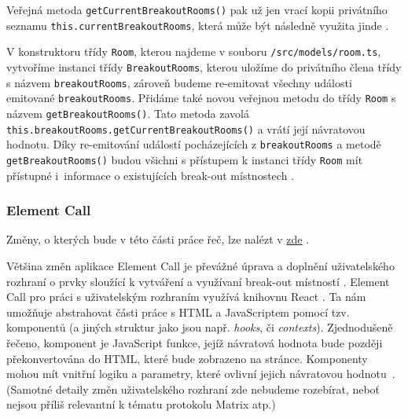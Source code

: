 Veřejná metoda \texttt{getCurrentBreakoutRooms()} pak už jen
vrací kopii privátního seznamu
\texttt{this.currentBreakoutRooms}, která může být následně
využita jinde \parencite{GitHub-MatrixJSSDK-BreakoutRooms}.

V konstruktoru třídy \texttt{Room}, kterou najdeme v souboru
\texttt{/src/models/room.ts}, vytvoříme instanci třídy
\texttt{BreakoutRooms}, kterou uložíme do privátního člena třídy
s názvem \texttt{breakoutRooms}, zároveň budeme re-emitovat
všechny události emitované \texttt{breakoutRooms}. Přidáme také
novou veřejnou metodu do třídy \texttt{Room} s názvem
\texttt{getBreakoutRooms()}. Tato metoda zavolá
\texttt{this.breakoutRooms.getCurrentBreakoutRooms()} a vrátí
její návratovou hodnotu. Díky re-emitování událostí pocházejících z
\texttt{breakoutRooms} a metodě
\texttt{getBreakoutRooms()} budou všichni s přístupem k instanci
třídy \texttt{Room} mít přístupné i~informace o existujících
break-out místnostech \parencite{GitHub-MatrixJSSDK-BreakoutRooms}.

\subsubsection{Element Call}

Změny, o kterých bude v této části práce řeč, lze nalézt v
\href{https://github.com/vector-im/element-call/pull/1615/}{zde}
\parencite{GitHub-ElementCall-BreakoutRooms}.

Většina změn aplikace Element Call je převážné úprava a doplnění uživatelského
rozhraní o prvky sloužící k vytváření a využívaní break-out místností
\parencite{GitHub-ElementCall-BreakoutRooms}. Element Call pro práci s uživatelským
rozhraním využívá knihovnu React \parencite{GitHub-ElementCall}. Ta nám umožňuje
abstrahovat části práce s HTML a JavaScriptem pomocí tzv. komponentů (a jiných
struktur jako jsou např. \textit{hooks}, či \textit{contexts}). Zjednodušeně
řečeno, komponent je JavaScript funkce, jejíž návratová hodnota bude později
překonvertována do HTML, které bude zobrazeno na stránce. Komponenty mohou mít
vnitřní logiku a parametry, které ovlivní jejich návratovou
hodnotu~\parencite{React-Homepage}. (Samotné detaily změn uživatelského rozhraní zde
nebudeme rozebírat, neboť nejsou příliš relevantní k tématu protokolu Matrix
atp.)

